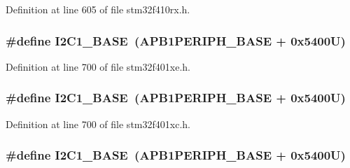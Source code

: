 Definition at line 605 of file stm32f410rx.\+h.

\subsubsection[{\texorpdfstring{I2\+C1\+\_\+\+B\+A\+SE}{I2C1_BASE}}]{\setlength{\rightskip}{0pt plus 5cm}\#define I2\+C1\+\_\+\+B\+A\+SE~({\bf A\+P\+B1\+P\+E\+R\+I\+P\+H\+\_\+\+B\+A\+SE} + 0x5400\+U)}\hypertarget{group___peripheral__registers__structures_gacd72dbffb1738ca87c838545c4eb85a3}{}\label{group___peripheral__registers__structures_gacd72dbffb1738ca87c838545c4eb85a3}


Definition at line 700 of file stm32f401xe.\+h.

\subsubsection[{\texorpdfstring{I2\+C1\+\_\+\+B\+A\+SE}{I2C1_BASE}}]{\setlength{\rightskip}{0pt plus 5cm}\#define I2\+C1\+\_\+\+B\+A\+SE~({\bf A\+P\+B1\+P\+E\+R\+I\+P\+H\+\_\+\+B\+A\+SE} + 0x5400\+U)}\hypertarget{group___peripheral__registers__structures_gacd72dbffb1738ca87c838545c4eb85a3}{}\label{group___peripheral__registers__structures_gacd72dbffb1738ca87c838545c4eb85a3}


Definition at line 700 of file stm32f401xc.\+h.

\subsubsection[{\texorpdfstring{I2\+C1\+\_\+\+B\+A\+SE}{I2C1_BASE}}]{\setlength{\rightskip}{0pt plus 5cm}\#define I2\+C1\+\_\+\+B\+A\+SE~({\bf A\+P\+B1\+P\+E\+R\+I\+P\+H\+\_\+\+B\+A\+SE} + 0x5400\+U)}\hypertarget{group___peripheral__registers__structures_gacd72dbffb1738ca87c838545c4eb85a3}{}\label{group___peripheral__registers__structures_gacd72dbffb1738ca87c838545c4eb85a3}


